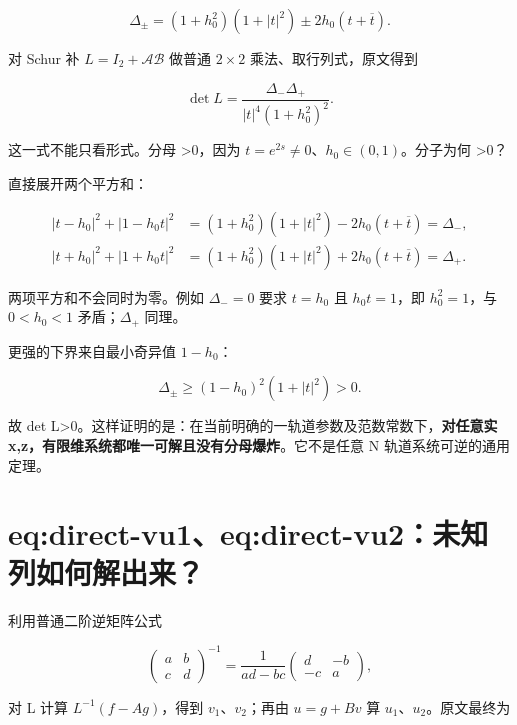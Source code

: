 \[
\Delta_\pm=(1+h_0^2)(1+|t|^2)
\pm2h_0(t+\overline t).
\]

对 Schur 补 $L=I_{2}+\mathcal A\mathcal B$ 做普通 $2\times{}2$ 乘法、取行列式，原文得到\par

\[
\boxed{
\det L
=\dfrac{\Delta_-\Delta_+}
{|t|^4(1+h_0^2)^2}.
}
\]

这一式不能只看形式。分母 >0，因为 $t=e^{2s}\ne{}0$、$h_{0}\in{}(0,1)$。分子为何 >0？\par

直接展开两个平方和：\par

\[
\begin{aligned}
|t-h_0|^2+|1-h_0t|^2
&=(1+h_0^2)(1+|t|^2)-2h_0(t+\overline t)
=\Delta_-,\\
|t+h_0|^2+|1+h_0t|^2
&=(1+h_0^2)(1+|t|^2)+2h_0(t+\overline t)
=\Delta_+.
\end{aligned}
\]

两项平方和不会同时为零。例如 $\Delta{}_{-}=0$ 要求 $t=h_{0}$ 且 $h_{0}t=1$，即 $h_{0}^{2}=1$，与 $0<h_{0}<1$ 矛盾；$\Delta{}_{+}$ 同理。\par

更强的下界来自最小奇异值 $1-h_{0}$：\par

\[
\Delta_\pm\ge(1-h_0)^2(1+|t|^2)>0.
\]

故 det L>0。这样证明的是：在当前明确的一轨道参数及范数常数下，\textbf{对任意实 x,z，有限维系统都唯一可解且没有分母爆炸}。它不是任意 N 轨道系统可逆的通用定理。\par

\section{eq:direct-vu1、eq:direct-vu2：未知列如何解出来？}

利用普通二阶逆矩阵公式\par

\[
\begin{pmatrix}a&b\\c&d\end{pmatrix}^{-1}
=\dfrac{1}{ad-bc}\begin{pmatrix}d&-b\\-c&a\end{pmatrix},
\]

对 L 计算 $L^{-1}(f-Ag)$，得到 $v_{1}$、$v_{2}$；再由 $u=g+Bv$ 算 $u_{1}$、$u_{2}$。原文最终为\par

